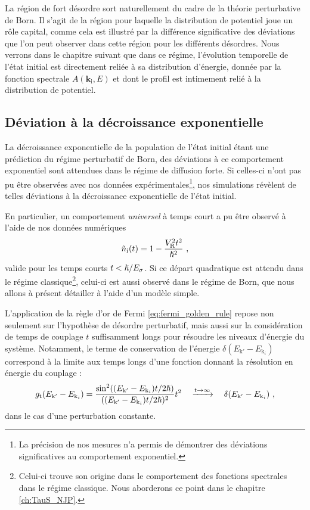 La région de fort désordre sort naturellement du cadre de la théorie perturbative de Born. Il s'agit de la région pour laquelle la distribution de potentiel joue un rôle capital, comme cela est illustré par la différence significative des déviations que l'on peut observer dans cette région pour les différents désordres. Nous verrons dans le chapitre suivant que dans ce régime, l'évolution temporelle de l'état initial est directement reliée à sa distribution d'énergie, donnée par la fonction spectrale $A(\mathbf{k}_{\mathrm{i}},E)$ et dont le profil est intimement relié à la distribution de potentiel.


\subsection{Déviation à la décroissance exponentielle}
La décroissance exponentielle de la population de l'état initial étant une prédiction du régime perturbatif de Born, des déviations à ce comportement exponentiel sont attendues dans le régime de diffusion forte. Si celles-ci n'ont pas pu être observées avec nos données expérimentales\footnote{La précision de nos mesures n'a permis de démontrer des déviations significatives au comportement exponentiel.}, nos simulations révèlent de telles déviations à la décroissance exponentielle de l'état initial.

En particulier, un comportement \emph{universel} à temps court a pu être observé à l'aide de nos données numériques
\begin{equation}
\tilde{n}_{\mathrm{i}}(t)=1-\frac{V_{\mathrm{R}}^2t^2}{\hslash^2} \text{ ,}
\label{eq:depart_quadratique}
\end{equation}
valide pour les temps courts $t<\hslash/E_{\sigma}$. Si ce départ quadratique est attendu dans le régime classique\footnote{Celui-ci trouve son origine dans le comportement des fonctions spectrales dans le régime classique. Nous aborderons ce point dans le chapitre \ref{ch:TauS_NJP}.}, celui-ci est aussi observé dans le régime de Born, que nous allons à présent détailler à l'aide d'un modèle simple.

L'application de la règle d'or de Fermi \ref{eq:fermi_golden_rule} repose non seulement sur l'hypothèse de désordre perturbatif, mais aussi sur la considération de temps de couplage $t$ suffisamment longs pour résoudre les niveaux d'énergie du système. Notamment, le terme de conservation de l'énergie $\delta(E_{\mathrm{k}'} - E_{\mathrm{k}_i})$ correspond à la limite aux temps longs d'une fonction donnant la résolution en énergie du couplage \citep{grynberg2010introduction}:
\begin{equation}
g_{\mathrm{t}}(E_{\mathrm{k}'} - E_{\mathrm{k}_i}) = \frac{\sin^2((E_{\mathrm{k}'} - E_{\mathrm{k}_i})t/2\hslash)}{((E_{\mathrm{k}'} - E_{\mathrm{k}_i})t/2\hslash)^2} t^2 \quad \xrightarrow{t\to\infty} \quad \delta(E_{\mathrm{k}'} - E_{\mathrm{k}_i}) \text{ ,}
\end{equation}
dans le cas d'une perturbation constante.

